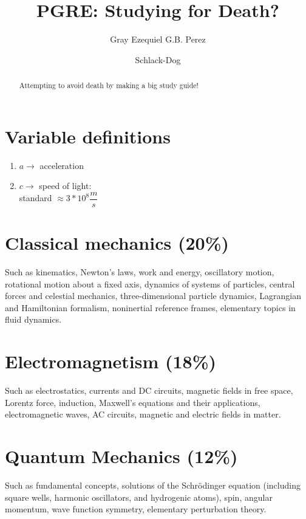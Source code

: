 \documentclass[%
 reprint,
superscriptaddress,
 amsmath,amssymb,
 aps,
prc,
]{revtex4-1}
\begin{document}

\title{PGRE: Studying for Death?}%

\author{Gray Ezequiel G.B. Perez}
\author{Schlack-Dog}
%

\begin{abstract}
Attempting to avoid death by making a big study guide!
\end{abstract}
\maketitle
\tableofcontents
\section{Variable definitions}
\begin{enumerate}
\item[] $a\rightarrow$ acceleration

\item[] $c\rightarrow$ speed of light:\\
standard  $\approx 3*10^8\dfrac{m}{s}$

\end{enumerate}

\section{Classical mechanics (20\%)}
Such as kinematics, Newton's laws, work and energy, oscillatory motion, rotational motion about a fixed axis, dynamics of systems of particles, central forces and celestial mechanics, three-dimensional particle dynamics, Lagrangian and Hamiltonian formalism, noninertial reference frames, elementary topics in fluid dynamics.

\section{Electromagnetism (18\%)}
Such as electrostatics, currents and DC circuits, magnetic fields in free space, Lorentz force, induction, Maxwell's equations and their applications, electromagnetic waves, AC circuits, magnetic and electric fields in matter.

\section{Quantum Mechanics (12\%)}
Such as fundamental concepts, solutions of the Schrödinger equation (including square wells, harmonic oscillators, and hydrogenic atoms), spin, angular momentum, wave function symmetry, elementary perturbation theory.
\end{document}

